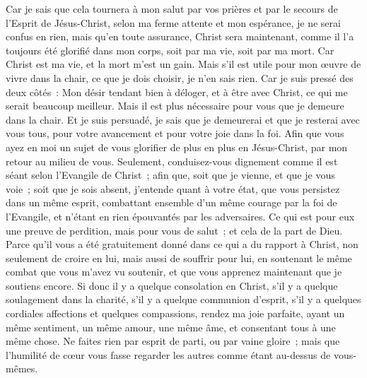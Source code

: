 \begin{multicols}{2}
Car je sais que cela tournera à mon salut par vos prières et par le secours de l'Esprit de Jésus-Christ,
selon ma ferme attente et mon espérance, je ne serai confus en rien, mais qu'en toute assurance, Christ sera maintenant, comme il l'a toujours été glorifié dans mon corps, soit par ma vie, soit par ma mort.
Car Christ est ma vie, et la mort m'est un gain.
Mais s'il est utile pour mon œuvre de vivre dans la chair, ce que je dois choisir, je n'en sais rien.
Car je suis pressé des deux côtés~: Mon désir tendant bien à déloger, et à être avec Christ, ce qui me serait beaucoup meilleur. 
Mais il est plus nécessaire pour vous que je demeure dans la chair.
Et je suis persuadé, je sais que je demeurerai et que je resterai avec vous tous, pour votre avancement et pour votre joie dans la foi.
Afin que vous ayez en moi un sujet de vous glorifier de plus en plus en Jésus-Christ, par mon retour au milieu de vous. 
Seulement, conduisez-vous dignement comme il est séant selon l'Evangile de Christ~; afin que, soit que je vienne, et que je vous voie~; soit que je sois absent, j'entende quant à votre état, que vous persistez dans un même esprit, combattant ensemble d'un même courage par la foi de l'Evangile, et n'étant en rien épouvantés par les adversaires.
Ce qui est pour eux une preuve de perdition, mais pour vous de salut~; et cela de la part de Dieu.
Parce qu'il vous a été gratuitement donné dans ce qui a du rapport à Christ, non seulement de croire en lui, mais aussi de souffrir pour lui,
en soutenant le même combat que vous m'avez vu soutenir, et que vous apprenez maintenant que je soutiens encore.
\VerseOne{}Si donc il y a quelque consolation en Christ, s'il y a quelque soulagement dans la charité, s'il y a quelque communion d'esprit, s'il y a quelques cordiales affections et quelques compassions,
rendez ma joie parfaite, ayant un même sentiment, un même amour, une même âme, et consentant tous à une même chose.
Ne faites rien par esprit de parti, ou par vaine gloire~; mais que l'humilité de cœur vous fasse regarder les autres comme étant au-dessus de vous-mêmes.

\end{multicols}
